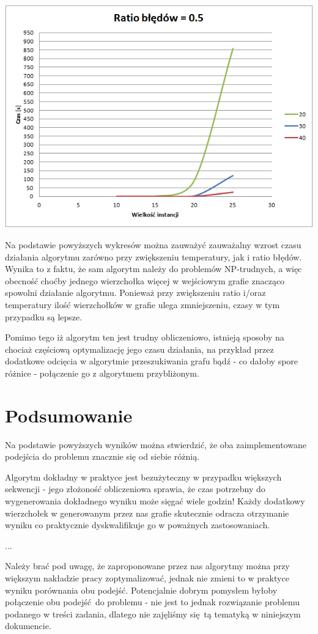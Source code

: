 \documentclass{article}
\begin{document}
\begin{center}
\includegraphics[scale=0.75]{0-5}

\end{center}

\newpage

Na podstawie powyższych wykresów można zauważyć zauważalny wzrost czasu działania algorytmu zarówno przy zwiększeniu temperatury, jak i ratio błędów. Wynika to z faktu, że sam algorytm należy do problemów NP-trudnych, a więc obecność choćby jednego wierzchołka więcej w wejściowym grafie znacząco spowolni działanie algorytmu. Ponieważ przy zwiększeniu ratio i/oraz temperatury ilość wierzchołków w grafie ulega zmniejszeniu, czasy w tym przypadku są lepsze.

Pomimo tego iż algorytm ten jest trudny obliczeniowo, istnieją sposoby na chociaż częściową optymalizację jego czasu działania, na przykład przez dodatkowe odcięcia w algorytmie przeszukiwania grafu bądź - co dałoby spore różnice - połączenie go z algorytmem przybliżonym. 

\section{Podsumowanie}

Na podstawie powyższych wyników można stwierdzić, że oba zaimplementowane podejścia do problemu znacznie się od siebie różnią.

Algorytm dokładny w praktyce jest bezużyteczny w przypadku większych sekwencji - jego złożoność obliczeniowa sprawia, że czas potrzebny do wygenerowania dokładnego wyniku może sięgać wiele godzin! Każdy dodatkowy wierzchołek w generowanym przez nas grafie skutecznie odracza otrzymanie wyniku co praktycznie dyskwalifikuje go w poważnych zastosowaniach. 

...

Należy brać pod uwagę, że zaproponowane przez nas algorytmy można przy większym nakładzie pracy zoptymalizować, jednak nie zmieni to w praktyce wyniku porównania obu podejść. Potencjalnie dobrym pomysłem byłoby połączenie obu podejść do problemu - nie jest to jednak rozwiązanie problemu podanego w treści zadania, dlatego nie zajęliśmy się tą tematyką w niniejszym dokumencie.
\end{document}
